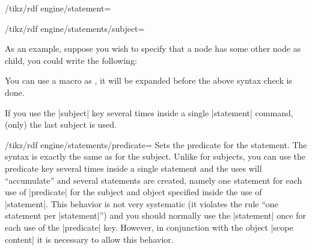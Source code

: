 \begin{key}{/tikz/rdf engine/statement=}
\begin{key}{/tikz/rdf engine/statements/subject=}
\begin{enumerate}
      As an example, suppose you wish to specify that a node has some
      other node as child, you could write the following: 
\begin{codeexample}
\end{codeexample}
    \end{enumerate}
    You can use a macro as , it will be expanded before
    the above syntax check is done.

    If you use the |subject| key several times inside a single
    |statement| command, (only) the last subject is used.
  \end{key}

  \begin{key}{/tikz/rdf engine/statements/predicate=}
    Sets the predicate for the statement. The syntax is exactly the
    same as for the subject. Unlike for subjects, you can use the 
    predicate key several times inside a single statement and the uses
    will ``accumulate'' and several statements are created, namely one
    statement for each use of |predicate| for the subject and object
    specified inside the use of |statement|. This behavior is not very
    systematic (it violates the rule ``one statement per
    |statement|'') and you should normally use the  |statement| once
    for each use  of the |predicate| key. However, in conjunction with
    the object |scope content| it is necessary to allow this
    behavior. 
  \end{key}


\end{key}
